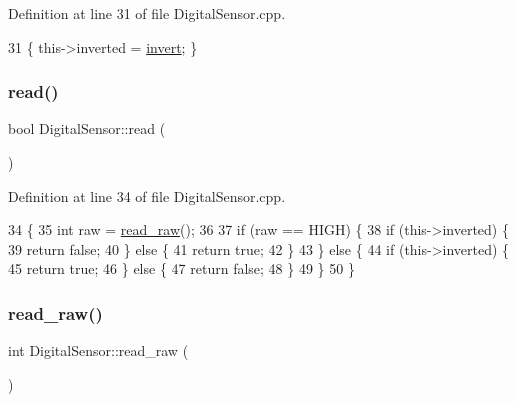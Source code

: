Definition at line 31 of file Digital\+Sensor.\+cpp.


\begin{DoxyCode}
31 \{ this->inverted = \hyperlink{class_digital_sensor_a1e6784022a127dd543bbfcc4f69c4802}{invert}; \}
\end{DoxyCode}
\mbox{\label{class_digital_sensor_a0b182fe8c229aaa0ea850889193f28f9}} 
\subsubsection{\texorpdfstring{read()}{read()}}
{\footnotesize\ttfamily bool Digital\+Sensor\+::read (\begin{DoxyParamCaption}{ }\end{DoxyParamCaption})}



Definition at line 34 of file Digital\+Sensor.\+cpp.


\begin{DoxyCode}
34                          \{
35     \textcolor{keywordtype}{int} raw = \hyperlink{class_digital_sensor_a8cbcce6b1e7929c24ddf5992ec2c7537}{read\_raw}();
36 
37     \textcolor{keywordflow}{if} (raw == HIGH) \{
38         \textcolor{keywordflow}{if} (this->inverted) \{
39             \textcolor{keywordflow}{return} \textcolor{keyword}{false};
40         \} \textcolor{keywordflow}{else} \{
41             \textcolor{keywordflow}{return} \textcolor{keyword}{true};
42         \}
43     \} \textcolor{keywordflow}{else} \{
44         \textcolor{keywordflow}{if} (this->inverted) \{
45             \textcolor{keywordflow}{return} \textcolor{keyword}{true};
46         \} \textcolor{keywordflow}{else} \{
47             \textcolor{keywordflow}{return} \textcolor{keyword}{false};
48         \}
49     \}
50 \}
\end{DoxyCode}
\mbox{\label{class_digital_sensor_a8cbcce6b1e7929c24ddf5992ec2c7537}} 
\subsubsection{\texorpdfstring{read\+\_\+raw()}{read\_raw()}}
{\footnotesize\ttfamily int Digital\+Sensor\+::read\+\_\+raw (\begin{DoxyParamCaption}{ }\end{DoxyParamCaption})}



